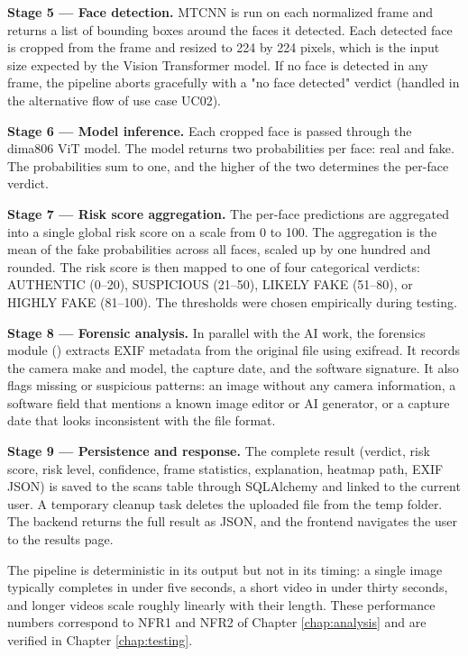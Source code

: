 \noindent\textbf{Stage 5 --- Face detection.} MTCNN is run on each normalized frame and returns a list of bounding boxes around the faces it detected. Each detected face is cropped from the frame and resized to 224 by 224 pixels, which is the input size expected by the Vision Transformer model. If no face is detected in any frame, the pipeline aborts gracefully with a "no face detected" verdict (handled in the alternative flow of use case UC02).

\noindent\textbf{Stage 6 --- Model inference.} Each cropped face is passed through the dima806 ViT model. The model returns two probabilities per face: real and fake. The probabilities sum to one, and the higher of the two determines the per-face verdict.

\noindent\textbf{Stage 7 --- Risk score aggregation.} The per-face predictions are aggregated into a single global risk score on a scale from 0 to 100. The aggregation is the mean of the fake probabilities across all faces, scaled up by one hundred and rounded. The risk score is then mapped to one of four categorical verdicts: AUTHENTIC (0--20), SUSPICIOUS (21--50), LIKELY FAKE (51--80), or HIGHLY FAKE (81--100). The thresholds were chosen empirically during testing.

\noindent\textbf{Stage 8 --- Forensic analysis.} In parallel with the AI work, the forensics module () extracts EXIF metadata from the original file using exifread. It records the camera make and model, the capture date, and the software signature. It also flags missing or suspicious patterns: an image without any camera information, a software field that mentions a known image editor or AI generator, or a capture date that looks inconsistent with the file format.

\noindent\textbf{Stage 9 --- Persistence and response.} The complete result (verdict, risk score, risk level, confidence, frame statistics, explanation, heatmap path, EXIF JSON) is saved to the scans table through SQLAlchemy and linked to the current user. A temporary cleanup task deletes the uploaded file from the temp folder. The backend returns the full result as JSON, and the frontend navigates the user to the results page.

The pipeline is deterministic in its output but not in its timing: a single image typically completes in under five seconds, a short video in under thirty seconds, and longer videos scale roughly linearly with their length. These performance numbers correspond to NFR1 and NFR2 of Chapter \ref{chap:analysis} and are verified in Chapter \ref{chap:testing}.

